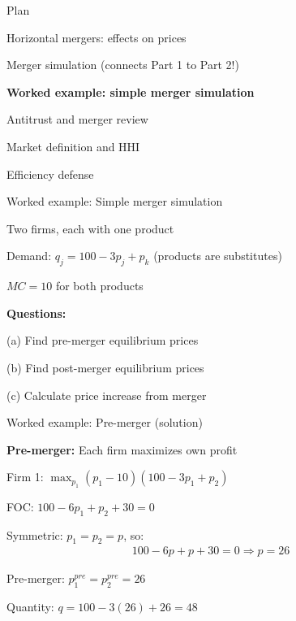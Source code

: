 \documentclass[notes,11pt, aspectratio=169]{beamer}
\newenvironment{wideitemize}{\itemize\addtolength{\itemsep}{10pt}}{\enditemize}
\newenvironment{wideenumerate}{\enumerate\addtolength{\itemsep}{10pt}}{\endenumerate}
\begin{document}
\begin{frame}{Plan}
  \begin{wideenumerate}
    \item Horizontal mergers: effects on prices
    \item Merger simulation (connects Part 1 to Part 2!)
    \item \textbf{Worked example: simple merger simulation}
    \item Antitrust and merger review
    \item Market definition and HHI
    \item Efficiency defense
  \end{wideenumerate}
\end{frame}

\begin{frame}{Worked example: Simple merger simulation}
	\begin{wideitemize}
		\item Two firms, each with one product
		\item Demand: $q_j = 100 - 3p_j + p_k$ (products are substitutes)
		\item $MC = 10$ for both products
		\item \textbf{Questions:}
		\item (a) Find pre-merger equilibrium prices
		\item (b) Find post-merger equilibrium prices
		\item (c) Calculate price increase from merger
	\end{wideitemize}
\end{frame}

\begin{frame}{Worked example: Pre-merger (solution)}
	\begin{wideitemize}
		\item \textbf{Pre-merger:} Each firm maximizes own profit
		\item Firm 1: $\max_{p_1} (p_1 - 10)(100 - 3p_1 + p_2)$
		\item FOC: $100 - 6p_1 + p_2 + 30 = 0$
		\item Symmetric: $p_1 = p_2 = p$, so:
		\begin{align*}
			100 - 6p + p + 30 = 0 \Rightarrow p = 26
		\end{align*}
		\item Pre-merger: $p_1^{pre} = p_2^{pre} = 26$
		\item Quantity: $q = 100 - 3(26) + 26 = 48$
	\end{wideitemize}
\end{frame}
\end{document}
